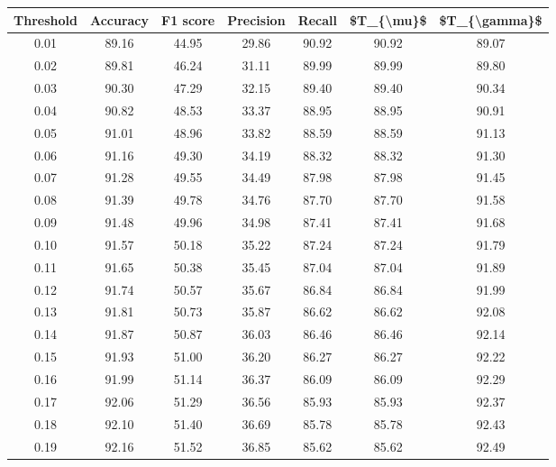 \begin{tabular}{|c|c|c|c|c|c|c|}
\hline
 Threshold &  Accuracy &  F1 score &  Precision &  Recall &  \$T\_\{\textbackslash mu\}\$ &  \$T\_\{\textbackslash gamma\}\$ \\
\hline
      0.01 &     89.16 &     44.95 &      29.86 &   90.92 &      90.92 &         89.07 \\
      0.02 &     89.81 &     46.24 &      31.11 &   89.99 &      89.99 &         89.80 \\
      0.03 &     90.30 &     47.29 &      32.15 &   89.40 &      89.40 &         90.34 \\
      0.04 &     90.82 &     48.53 &      33.37 &   88.95 &      88.95 &         90.91 \\
      0.05 &     91.01 &     48.96 &      33.82 &   88.59 &      88.59 &         91.13 \\
      0.06 &     91.16 &     49.30 &      34.19 &   88.32 &      88.32 &         91.30 \\
      0.07 &     91.28 &     49.55 &      34.49 &   87.98 &      87.98 &         91.45 \\
      0.08 &     91.39 &     49.78 &      34.76 &   87.70 &      87.70 &         91.58 \\
      0.09 &     91.48 &     49.96 &      34.98 &   87.41 &      87.41 &         91.68 \\
      0.10 &     91.57 &     50.18 &      35.22 &   87.24 &      87.24 &         91.79 \\
      0.11 &     91.65 &     50.38 &      35.45 &   87.04 &      87.04 &         91.89 \\
      0.12 &     91.74 &     50.57 &      35.67 &   86.84 &      86.84 &         91.99 \\
      0.13 &     91.81 &     50.73 &      35.87 &   86.62 &      86.62 &         92.08 \\
      0.14 &     91.87 &     50.87 &      36.03 &   86.46 &      86.46 &         92.14 \\
      0.15 &     91.93 &     51.00 &      36.20 &   86.27 &      86.27 &         92.22 \\
      0.16 &     91.99 &     51.14 &      36.37 &   86.09 &      86.09 &         92.29 \\
      0.17 &     92.06 &     51.29 &      36.56 &   85.93 &      85.93 &         92.37 \\
      0.18 &     92.10 &     51.40 &      36.69 &   85.78 &      85.78 &         92.43 \\
      0.19 &     92.16 &     51.52 &      36.85 &   85.62 &      85.62 &         92.49 \\

\end{tabular}
